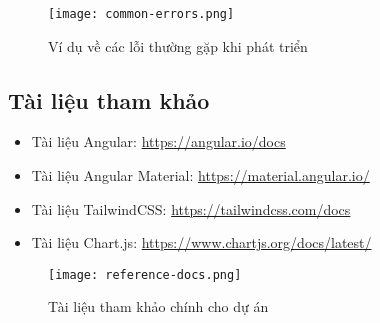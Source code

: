 \documentclass[12pt,a4paper]{article}
\begin{document}
\begin{figure}[h]
\centering
\texttt{[image: common-errors.png]}
\caption{Ví dụ về các lỗi thường gặp khi phát triển}
\end{figure}

\subsection{Tài liệu tham khảo}

\begin{itemize}
  \item Tài liệu Angular: \url{https://angular.io/docs}
  \item Tài liệu Angular Material: \url{https://material.angular.io/}
  \item Tài liệu TailwindCSS: \url{https://tailwindcss.com/docs}
  \item Tài liệu Chart.js: \url{https://www.chartjs.org/docs/latest/}
\end{itemize}

\begin{figure}[h]
\centering
\texttt{[image: reference-docs.png]}
\caption{Tài liệu tham khảo chính cho dự án}
\end{figure}
\end{document}
